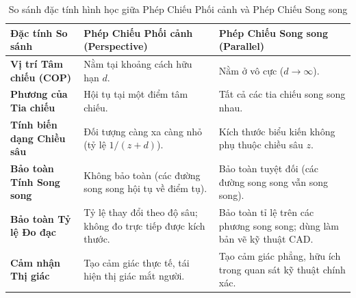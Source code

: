 \begin{table}[ht]
\centering
\small
\caption{So sánh đặc tính hình học giữa Phép Chiếu Phối cảnh và Phép Chiếu Song song}
\label{tab:perspective_vs_parallel}
\renewcommand{\arraystretch}{1.3}
\begin{tabularx}{\textwidth}{|p{3.5cm}|X|X|}
\hline
\textbf{Đặc tính So sánh} & \textbf{Phép Chiếu Phối cảnh (Perspective)} & \textbf{Phép Chiếu Song song (Parallel)} \\
\hline
\textbf{Vị trí Tâm chiếu (COP)} & Nằm tại khoảng cách hữu hạn $d$. & Nằm ở vô cực ($d \to \infty$). \\
\hline
\textbf{Phương của Tia chiếu} & Hội tụ tại một điểm tâm chiếu. & Tất cả các tia chiếu song song nhau. \\
\hline
\textbf{Tính biến dạng Chiều sâu} & Đối tượng càng xa càng nhỏ (tỷ lệ $1/(z+d)$). & Kích thước biểu kiến không phụ thuộc chiều sâu $z$. \\
\hline
\textbf{Bảo toàn Tính Song song} & Không bảo toàn (các đường song song hội tụ về điểm tụ). & Bảo toàn tuyệt đối (các đường song song vẫn song song). \\
\hline
\textbf{Bảo toàn Tỷ lệ Đo đạc} & Tỷ lệ thay đổi theo độ sâu; không đo trực tiếp được kích thước. & Bảo toàn tỉ lệ trên các phương song song; dùng làm bản vẽ kỹ thuật CAD. \\
\hline
\textbf{Cảm nhận Thị giác} & Tạo cảm giác thực tế, tái hiện thị giác mắt người. & Tạo cảm giác phẳng, hữu ích trong quan sát kỹ thuật chính xác. \\
\hline
\end{tabularx}
\end{table}
